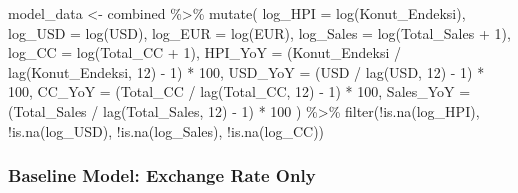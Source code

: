 \documentclass[
  11pt,
  a4paper,
  DIV=11,
  numbers=noendperiod]{scrartcl}
\newenvironment{Shaded}{\begin{snugshade}}{\end{snugshade}}
\newcommand{\AttributeTok}[1]{\textcolor[rgb]{0.40,0.45,0.13}{#1}}
\newcommand{\DecValTok}[1]{\textcolor[rgb]{0.68,0.00,0.00}{#1}}
\newcommand{\FunctionTok}[1]{\textcolor[rgb]{0.28,0.35,0.67}{#1}}
\newcommand{\NormalTok}[1]{\textcolor[rgb]{0.00,0.23,0.31}{#1}}
\newcommand{\OtherTok}[1]{\textcolor[rgb]{0.00,0.23,0.31}{#1}}
\newcommand{\SpecialCharTok}[1]{\textcolor[rgb]{0.37,0.37,0.37}{#1}}
\begin{document}
\begin{Shaded}
\begin{Highlighting}[]
\NormalTok{model\_data }\OtherTok{\textless{}{-}}\NormalTok{ combined }\SpecialCharTok{\%\textgreater{}\%}
  \FunctionTok{mutate}\NormalTok{(}
    \AttributeTok{log\_HPI =} \FunctionTok{log}\NormalTok{(Konut\_Endeksi),}
    \AttributeTok{log\_USD =} \FunctionTok{log}\NormalTok{(USD),}
    \AttributeTok{log\_EUR =} \FunctionTok{log}\NormalTok{(EUR),}
    \AttributeTok{log\_Sales =} \FunctionTok{log}\NormalTok{(Total\_Sales }\SpecialCharTok{+} \DecValTok{1}\NormalTok{),}
    \AttributeTok{log\_CC =} \FunctionTok{log}\NormalTok{(Total\_CC }\SpecialCharTok{+} \DecValTok{1}\NormalTok{),}
    \AttributeTok{HPI\_YoY =}\NormalTok{ (Konut\_Endeksi }\SpecialCharTok{/} \FunctionTok{lag}\NormalTok{(Konut\_Endeksi, }\DecValTok{12}\NormalTok{) }\SpecialCharTok{{-}} \DecValTok{1}\NormalTok{) }\SpecialCharTok{*} \DecValTok{100}\NormalTok{,}
    \AttributeTok{USD\_YoY =}\NormalTok{ (USD }\SpecialCharTok{/} \FunctionTok{lag}\NormalTok{(USD, }\DecValTok{12}\NormalTok{) }\SpecialCharTok{{-}} \DecValTok{1}\NormalTok{) }\SpecialCharTok{*} \DecValTok{100}\NormalTok{,}
    \AttributeTok{CC\_YoY =}\NormalTok{ (Total\_CC }\SpecialCharTok{/} \FunctionTok{lag}\NormalTok{(Total\_CC, }\DecValTok{12}\NormalTok{) }\SpecialCharTok{{-}} \DecValTok{1}\NormalTok{) }\SpecialCharTok{*} \DecValTok{100}\NormalTok{,}
    \AttributeTok{Sales\_YoY =}\NormalTok{ (Total\_Sales }\SpecialCharTok{/} \FunctionTok{lag}\NormalTok{(Total\_Sales, }\DecValTok{12}\NormalTok{) }\SpecialCharTok{{-}} \DecValTok{1}\NormalTok{) }\SpecialCharTok{*} \DecValTok{100}
\NormalTok{  ) }\SpecialCharTok{\%\textgreater{}\%}
  \FunctionTok{filter}\NormalTok{(}\SpecialCharTok{!}\FunctionTok{is.na}\NormalTok{(log\_HPI), }\SpecialCharTok{!}\FunctionTok{is.na}\NormalTok{(log\_USD), }\SpecialCharTok{!}\FunctionTok{is.na}\NormalTok{(log\_Sales), }\SpecialCharTok{!}\FunctionTok{is.na}\NormalTok{(log\_CC))}
\end{Highlighting}
\end{Shaded}

\subsubsection{Baseline Model: Exchange Rate
Only}\label{baseline-model-exchange-rate-only}
\end{document}
